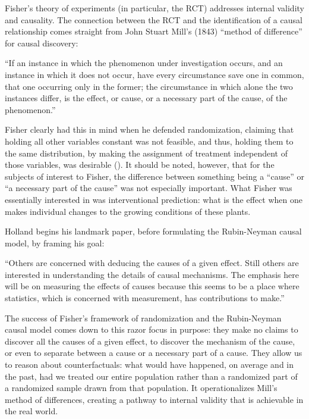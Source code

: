 \documentclass[a4paper,12pt]{article}
\begin{document}
Fisher's theory of experiments (in particular, the RCT) addresses internal validity and causality. The connection between the RCT and the identification of a causal relationship comes straight from John Stuart Mill's (1843) ``method of difference'' for causal discovery:

\begin{displayquote}
  ``If an instance in which the phenomenon under investigation occurs, and an instance in which it does not occur, have every circumstance save one in common, that one occurring only in the former; the circumstance in which alone the two instances differ, is the effect, or cause, or a necessary part of the cause, of the phenomenon.''
\end{displayquote}

Fisher \parencite*{Fisher1935} clearly had this in mind when he defended randomization, claiming that holding all other variables constant was not feasible, and thus, holding them to the same distribution, by making the assignment of treatment independent of those variables, was desirable (\cite{Rosenbaum2005}). It should be noted, however, that for the subjects of interest to Fisher, the difference between something being a ``cause'' or ``a necessary part of the cause'' was not especially important. What Fisher was essentially interested in was interventional prediction: what is the effect when one makes individual changes to the growing conditions of these plants. 

Holland \parencite*{Holland1986} begins his landmark paper, before formulating the Rubin-Neyman causal model, by framing his goal:

\begin{displayquote}
``Others are concerned with deducing the causes of a given effect. Still others are interested in understanding the details of causal mechanisms. The emphasis here will be on measuring the effects of causes because this seems to be a place where statistics, which is concerned with measurement, has contributions to make.''
\end{displayquote}

The success of Fisher's framework of randomization and the Rubin-Neyman causal model comes down to this razor focus in purpose: they make no claims to discover all the causes of a given effect, to discover the mechanism of the cause, or even to separate between a cause or a necessary part of a cause. They allow us to reason about counterfactuals: what would have happened, on average and in the past, had we treated our entire population rather than a randomized part of a randomized sample drawn from that population. It operationalizes Mill's method of differences, creating a pathway to internal validity that is achievable in the real world. 
\end{document}
